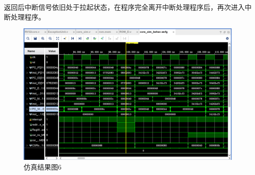 返回后中断信号依旧处于拉起状态，在程序完全离开中断处理程序后，再次进入中断处理程序。
\begin{figure}[H] %
	\centering %
	\includegraphics[width=1.0\textwidth]{figs/6.png} %
	\caption{仿真结果图6} %
	\label{Fig.16} %
\end{figure}
